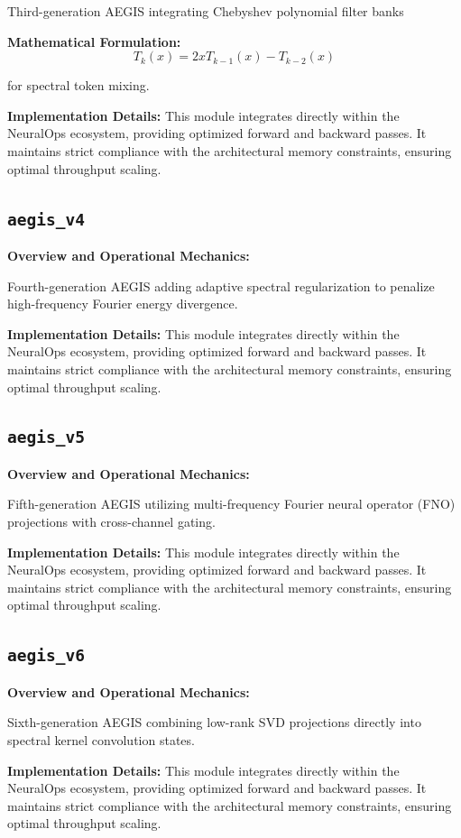 \documentclass[10pt,twocolumn,letterpaper]{article}
\begin{document}
Third-generation AEGIS integrating Chebyshev polynomial filter banks

\textbf{Mathematical Formulation:}
\begin{equation}
T_k(x) = 2x T_{k-1}(x) - T_{k-2}(x)
\end{equation}

for spectral token mixing.

\textbf{Implementation Details:}
This module integrates directly within the NeuralOps ecosystem, providing optimized forward and backward passes. It maintains strict compliance with the architectural memory constraints, ensuring optimal throughput scaling.

\subsection{\texttt{aegis\_v4}}
\textbf{Overview and Operational Mechanics:}

Fourth-generation AEGIS adding adaptive spectral regularization to penalize high-frequency Fourier energy divergence.

\textbf{Implementation Details:}
This module integrates directly within the NeuralOps ecosystem, providing optimized forward and backward passes. It maintains strict compliance with the architectural memory constraints, ensuring optimal throughput scaling.

\subsection{\texttt{aegis\_v5}}
\textbf{Overview and Operational Mechanics:}

Fifth-generation AEGIS utilizing multi-frequency Fourier neural operator (FNO) projections with cross-channel gating.

\textbf{Implementation Details:}
This module integrates directly within the NeuralOps ecosystem, providing optimized forward and backward passes. It maintains strict compliance with the architectural memory constraints, ensuring optimal throughput scaling.

\subsection{\texttt{aegis\_v6}}
\textbf{Overview and Operational Mechanics:}

Sixth-generation AEGIS combining low-rank SVD projections directly into spectral kernel convolution states.

\textbf{Implementation Details:}
This module integrates directly within the NeuralOps ecosystem, providing optimized forward and backward passes. It maintains strict compliance with the architectural memory constraints, ensuring optimal throughput scaling.
\end{document}
